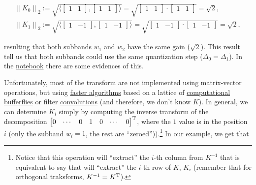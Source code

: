 \begin{equation}
  \begin{array}{l}
    \left\| K_0 \right\|_2 := \sqrt{\langle \begin{bmatrix}1 & 1\end{bmatrix}, \begin{bmatrix}1 & 1\end{bmatrix} \rangle} = \sqrt{\begin{bmatrix}1 & 1\end{bmatrix}\cdot \begin{bmatrix}1 & 1\end{bmatrix}} = \sqrt{2},\\
    \left\| K_1 \right\|_2 := \sqrt{\langle \begin{bmatrix}1 & -1\end{bmatrix}, \begin{bmatrix}1 & -1\end{bmatrix} \rangle} = \sqrt{\begin{bmatrix}1 & -1\end{bmatrix}\cdot \begin{bmatrix}1 & -1\end{bmatrix}} = \sqrt{2},
  \end{array}
\end{equation}

resulting that both subbands $w_1$ and $w_2$ have the same gain
($\sqrt{2}$). This result tell us that both subbands could use the
same quantization step ($\Delta_0=\Delta_1$). In the
\href{https://github.com/Tecnologias-multimedia/intercom/blob/master/docs/stereo_transforms_RD.ipynb}{notebook}
there are some evidences of this.

Unfortunately, most of the transform are not implemented using
matrix-vector operations, but using
\href{https://en.wikipedia.org/wiki/Fast_Fourier_transform}{faster
  algorithms} based on a lattice of
\href{https://en.wikipedia.org/wiki/Butterfly_diagram}{computational
  bufferflies} or filter
\href{https://en.wikipedia.org/wiki/Filter_(signal_processing)}{convolutions}
(and therefore, we don't know $K$). In general, we can determine $K_i$
simply by computing the inverse transform of the decomposition
$\begin{bmatrix} 0 & \cdots & 0 & 1 & 0 & \cdots &
  0 \end{bmatrix}^{\text T}$, where the $1$ value is in the position
$i$ (only the subband $w_i=1$, the rest are
``zeroed'')).\footnote{Notice that this operation will ``extract'' the
  $i$-th column from $K^{-1}$ that is equivalent to say that will
  ``extract'' the $i$-th row of $K$, $K_i$ (remember that for
  orthogonal traksforms, $K^{-1}=K^{\text T}$).} In our example, we
get that

